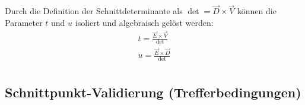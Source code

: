 \documentclass{article}
\begin{document}
    Durch die Definition der Schnittdeterminante als $\det = \vec{D} \times \vec{V}$ können die Parameter $t$ und $u$ isoliert und algebraisch gelöst werden:
    \begin{gather*}
        t = \frac{\vec{E} \times \vec{V}}{\det}\\
        u = \frac{\vec{E} \times \vec{D}}{\det}\\
    \end{gather*}

    \subsection{Schnittpunkt-Validierung (Trefferbedingungen)}\label{subsec:intersection-validation-(hit-conditions)}

\end{document}
